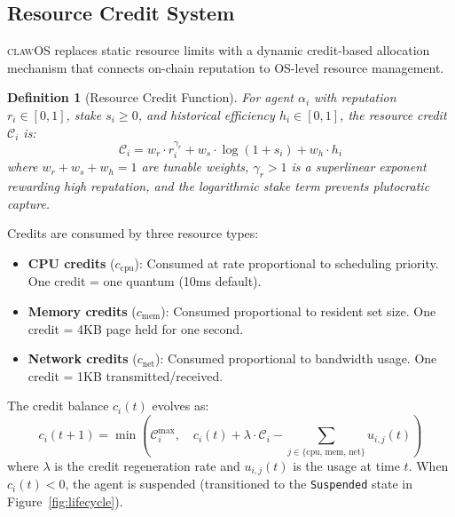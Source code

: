 \documentclass{article}
\newtheorem{definition}{Definition}
\newcommand{\clawos}{\textsc{clawOS}}
\begin{document}
\subsection{Resource Credit System}
\label{subsec:credits}

\clawos{} replaces static resource limits with a dynamic credit-based allocation mechanism that connects on-chain reputation to OS-level resource management.

\begin{definition}[Resource Credit Function]
For agent $\alpha_i$ with reputation $r_i \in [0,1]$, stake $s_i \geq 0$, and historical efficiency $h_i \in [0,1]$, the resource credit $\mathcal{C}_i$ is:
$$\mathcal{C}_i = w_r \cdot r_i^{\gamma_r} + w_s \cdot \log(1 + s_i) + w_h \cdot h_i$$
where $w_r + w_s + w_h = 1$ are tunable weights, $\gamma_r > 1$ is a superlinear exponent rewarding high reputation, and the logarithmic stake term prevents plutocratic capture.
\end{definition}

Credits are consumed by three resource types:

\begin{itemize}[leftmargin=*]
    \item \textbf{CPU credits} ($c_{\text{cpu}}$): Consumed at rate proportional to scheduling priority. One credit = one quantum (10ms default).
    \item \textbf{Memory credits} ($c_{\text{mem}}$): Consumed proportional to resident set size. One credit = 4KB page held for one second.
    \item \textbf{Network credits} ($c_{\text{net}}$): Consumed proportional to bandwidth usage. One credit = 1KB transmitted/received.
\end{itemize}

The credit balance $c_i(t)$ evolves as:
$$c_i(t+1) = \min\left(\mathcal{C}_i^{\max}, \quad c_i(t) + \lambda \cdot \mathcal{C}_i - \sum_{j \in \{\text{cpu, mem, net}\}} u_{i,j}(t)\right)$$
where $\lambda$ is the credit regeneration rate and $u_{i,j}(t)$ is the usage at time $t$. When $c_i(t) < 0$, the agent is suspended (transitioned to the \texttt{Suspended} state in Figure~\ref{fig:lifecycle}).
\end{document}
